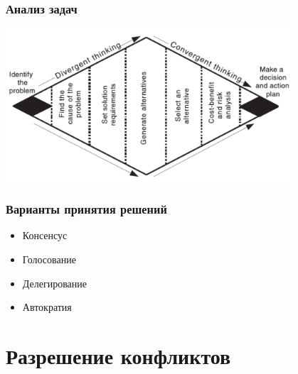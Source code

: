 \documentclass{../../slides-style}
\begin{document}
    \begin{frame}
        \frametitle{Анализ задач}
        \begin{center}
            \includegraphics[width=0.8\textwidth]{taskAnalysis.png}
        \end{center}
    \end{frame}

    \begin{frame}
        \frametitle{Варианты принятия решений}
        \begin{itemize}
            \item Консенсус
            \item Голосование
            \item Делегирование
            \item Автократия
        \end{itemize}
    \end{frame}

    \section{Разрешение конфликтов}
\end{document}
